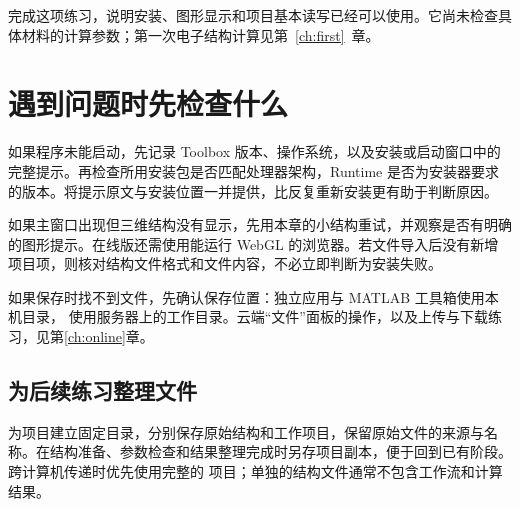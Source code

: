 
完成这项练习，说明安装、图形显示和项目基本读写已经可以使用。它尚未检查具体材料的计算参数；第一次电子结构计算见第~\ref{ch:first}~章。

\section{遇到问题时先检查什么}

如果程序未能启动，先记录 Toolbox 版本、操作系统，以及安装或启动窗口中的完整提示。再检查所用安装包是否匹配处理器架构，Runtime 是否为安装器要求的版本。将提示原文与安装位置一并提供，比反复重新安装更有助于判断原因。

如果主窗口出现但三维结构没有显示，先用本章的小结构重试，并观察是否有明确的图形提示。在线版还需使用能运行 WebGL 的浏览器。若文件导入后没有新增项目项，则核对结构文件格式和文件内容，不必立即判断为安装失败。

如果保存时找不到文件，先确认保存位置：独立应用与 MATLAB\regmark{} 工具箱使用本机目录，\ksonline{} 使用服务器上的工作目录。云端“文件”面板的操作，以及上传与下载练习，见第\ref{ch:online}章。

\subsection{为后续练习整理文件}

为项目建立固定目录，分别保存原始结构和工作项目，保留原始文件的来源与名称。在结构准备、参数检查和结果整理完成时另存项目副本，便于回到已有阶段。跨计算机传递时优先使用完整的  项目；单独的结构文件通常不包含工作流和计算结果。


